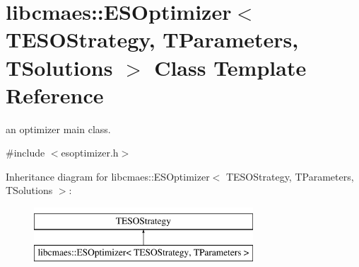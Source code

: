 \hypertarget{classlibcmaes_1_1ESOptimizer}{\section{libcmaes\-:\-:E\-S\-Optimizer$<$ T\-E\-S\-O\-Strategy, T\-Parameters, T\-Solutions $>$ Class Template Reference}
\label{classlibcmaes_1_1ESOptimizer}
}


an optimizer main class.  




{\ttfamily \#include $<$esoptimizer.\-h$>$}

Inheritance diagram for libcmaes\-:\-:E\-S\-Optimizer$<$ T\-E\-S\-O\-Strategy, T\-Parameters, T\-Solutions $>$\-:\begin{figure}[H]
\begin{center}
\leavevmode
\includegraphics[height=2.000000cm]{classlibcmaes_1_1ESOptimizer}
\end{center}
\end{figure}
